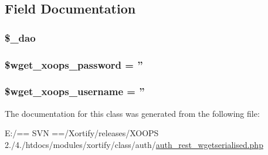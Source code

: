 \subsection{Field Documentation}
\hypertarget{class_xortify_auth_rest___wgetserialised_a12a029c610f699b4b25e79a1f64a3485}{
\subsubsection[{\$\-\_\-dao}]{\setlength{\rightskip}{0pt plus 5cm}\$\-\_\-dao}}\label{class_xortify_auth_rest___wgetserialised_a12a029c610f699b4b25e79a1f64a3485}
\hypertarget{class_xortify_auth_rest___wgetserialised_ab9145a618042e8282ecb90d5f634311f}{
\subsubsection[{\$wget\-\_\-xoops\-\_\-password}]{\setlength{\rightskip}{0pt plus 5cm}\$wget\-\_\-xoops\-\_\-password = ''}}\label{class_xortify_auth_rest___wgetserialised_ab9145a618042e8282ecb90d5f634311f}
\hypertarget{class_xortify_auth_rest___wgetserialised_a237f5dcc3c161c5b1909327a90b56618}{
\subsubsection[{\$wget\-\_\-xoops\-\_\-username}]{\setlength{\rightskip}{0pt plus 5cm}\$wget\-\_\-xoops\-\_\-username = ''}}\label{class_xortify_auth_rest___wgetserialised_a237f5dcc3c161c5b1909327a90b56618}


The documentation for this class was generated from the following file\-:\begin{DoxyCompactItemize}
\item 
E\-:/== S\-V\-N ==/\-Xortify/releases/\-X\-O\-O\-P\-S 2./4./htdocs/modules/xortify/class/auth/\hyperlink{auth__rest__wgetserialised_8php}{auth\-\_\-rest\-\_\-wgetserialised.\-php}\end{DoxyCompactItemize}
